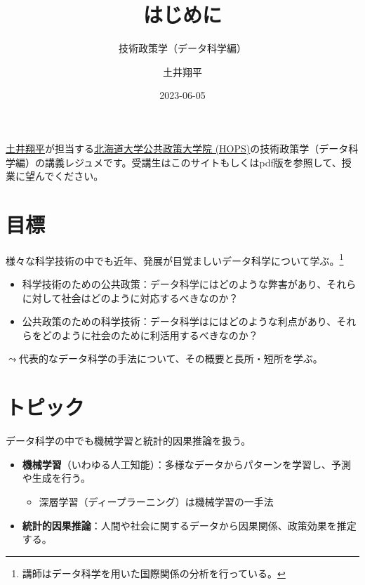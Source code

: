 \documentclass[
  xelatex,
  ja=standard]{bxjsarticle}
\title{はじめに}
\subtitle{技術政策学（データ科学編）}
\author{土井翔平}
\date{2023-06-05}
\providecommand{\tightlist}{%
  \setlength{\itemsep}{0pt}\setlength{\parskip}{0pt}}\usepackage{longtable,booktabs,array}
\begin{document}
\maketitle
\ifdefined\Shaded\renewenvironment{Shaded}{\begin{tcolorbox}[boxrule=0pt, borderline west={3pt}{0pt}{shadecolor}, breakable, enhanced, interior hidden, frame hidden, sharp corners]}{\end{tcolorbox}}\fi

\href{https://shohei-doi.github.io}{土井翔平}が担当する\href{https://www.hops.hokudai.ac.jp/}{北海道大学公共政策大学院
(HOPS)}の技術政策学（データ科学編）の講義レジュメです。受講生はこのサイトもしくはpdf版を参照して、授業に望んでください。

\hypertarget{ux76eeux6a19}{%
\section{目標}\label{ux76eeux6a19}}

様々な科学技術の中でも近年、発展が目覚ましいデータ科学について学ぶ。\footnote{講師はデータ科学を用いた国際関係の分析を行っている。}

\begin{itemize}
\tightlist
\item
  科学技術のための公共政策：データ科学にはどのような弊害があり、それらに対して社会はどのように対応するべきなのか？
\item
  公共政策のための科学技術：データ科学はにはどのような利点があり、それらをどのように社会のために利活用するべきなのか？
\end{itemize}

\(\leadsto\)代表的なデータ科学の手法について、その概要と長所・短所を学ぶ。

\hypertarget{ux30c8ux30d4ux30c3ux30af}{%
\section{トピック}\label{ux30c8ux30d4ux30c3ux30af}}

データ科学の中でも機械学習と統計的因果推論を扱う。

\begin{itemize}
\tightlist
\item
  \textbf{機械学習}（いわゆる人工知能）：多様なデータからパターンを学習し、予測や生成を行う。

  \begin{itemize}
  \tightlist
  \item
    深層学習（ディープラーニング）は機械学習の一手法
  \end{itemize}
\item
  \textbf{統計的因果推論}：人間や社会に関するデータから因果関係、政策効果を推定する。
\end{itemize}
\end{document}
